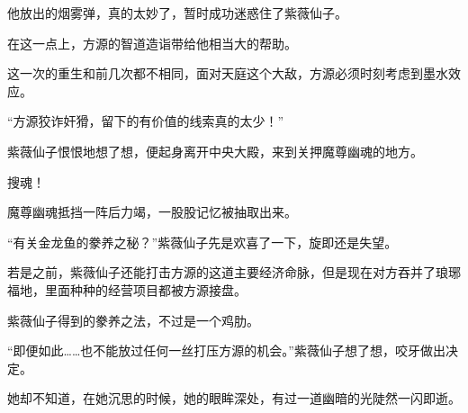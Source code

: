 \begin{this_body}
他放出的烟雾弹，真的太妙了，暂时成功迷惑住了紫薇仙子。

在这一点上，方源的智道造诣带给他相当大的帮助。

这一次的重生和前几次都不相同，面对天庭这个大敌，方源必须时刻考虑到墨水效应。

“方源狡诈奸猾，留下的有价值的线索真的太少！”

紫薇仙子恨恨地想了想，便起身离开中央大殿，来到关押魔尊幽魂的地方。

搜魂！

魔尊幽魂抵挡一阵后力竭，一股股记忆被抽取出来。

“有关金龙鱼的豢养之秘？”紫薇仙子先是欢喜了一下，旋即还是失望。

若是之前，紫薇仙子还能打击方源的这道主要经济命脉，但是现在对方吞并了琅琊福地，里面种种的经营项目都被方源接盘。

紫薇仙子得到的豢养之法，不过是一个鸡肋。

“即便如此……也不能放过任何一丝打压方源的机会。”紫薇仙子想了想，咬牙做出决定。

她却不知道，在她沉思的时候，她的眼眸深处，有过一道幽暗的光陡然一闪即逝。

\end{this_body}

